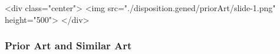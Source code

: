 \begin{whenOrg}
\begin{htmlonly}

\begin{frame}[fragile,plain,label=priorArt]
    \frametitle{}
    \framesubtitle{}
    \begin{rawhtml}
<div class="center">
<img src="./disposition.gened/priorArt/slide-1.png" height="500">
</div>
    \end{rawhtml}
\end{frame}
\end{htmlonly}

\begin{verblatex}

\begin{frame}[fragile,plain,label=priorArt]
    \frametitle{Prior Art and Similar Art}
    \framesubtitle{}




\end{frame}
\end{verblatex}
\end{whenOrg}
